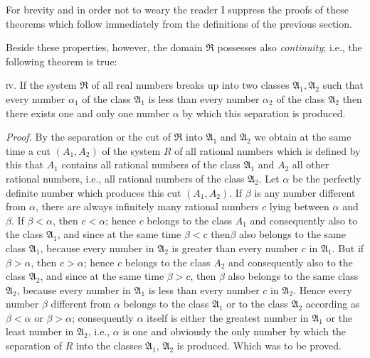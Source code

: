 \documentclass[oneside,12pt]{book}
\newcommand{\iit}[1]{\textit{#1}}
\begin{document}
For brevity and in order not to weary the reader I suppress the proofs of these theorems which follow immediately from the definitions of the previous section. \par 

Beside these properties, however, the domain $\mathfrak{R}$ possesses also \iit{continuity}; i.e., the following theorem is true: \par 

\textsc{iv.} If the system $\mathfrak{R}$ of all real numbers breaks up into two classes $\mathfrak{A}_1,\mathfrak{A}_2$ such that every number $\alpha_1$ of the class  $\mathfrak{A}_1$ is less than every number $\alpha_2$ of the class $\mathfrak{A}_2$ then there exists one and only one number $\alpha$ by which this separation is produced. \par 

\iit{Proof.} By the separation or the cut of $\Re$ into $\mathfrak{A}_1$ and $\mathfrak{A}_2$ we obtain at the same time a cut $(A_1,A_2)$ of the system $R$ of all rational numbers which is defined by this that $A_1$ contains all rational numbers of the class $\mathfrak{A}_1$ and $A_2$ all other rational numbers, i.e., all rational numbers of the class $\mathfrak{A}_2$. Let $\alpha$ be the perfectly definite number which produces this cut $(A_1,A_2)$. If $\beta$ is any number different from $\alpha$, there are always infinitely many rational numbers $c$ lying between $\alpha$ and $\beta$. If $\beta<\alpha$, then $c<\alpha$; hence $c$ belongs to the class $A_1$ and consequently also to the class $\mathfrak{A}_1$, and since at the same time $\beta<c$ then$\beta$ also belongs to the same class $\mathfrak{A}_1$, because every number in $\mathfrak{A}_2$ is greater than every number $c$ in $\mathfrak{A}_1$. But if $\beta>\alpha$, then $c>\alpha$; hence $c$ belongs to the class $A_2$ and consequently also to the class $\mathfrak{A}_2$, and since at the same time $\beta>c$, then $\beta$ also belongs to the same class $\mathfrak{A}_2$, because every number in $\mathfrak{A}_1$ is less than every number $c$ in $\mathfrak{A}_2$. Hence every number $\beta$ different from $\alpha$ belongs to the class $\mathfrak{A}_1$ or to the class $\mathfrak{A}_2$ according as $\beta<\alpha$ or $\beta>\alpha$; consequently $\alpha$ itself is either the greatest number in $\mathfrak{A}_1$ or the least number in $\mathfrak{A}_2$, i.e., $\alpha$ is one and obviously the only number by which the separation of $R$ into the classes $\mathfrak{A}_1$, $\mathfrak{A}_2$ is produced. Which was to be proved. \par 
\end{document}
